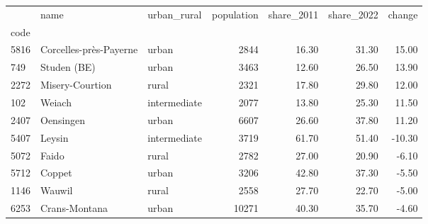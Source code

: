\begin{tabular}{lllrrrr}
\toprule
 & name & urban\_rural & population & share\_2011 & share\_2022 & change \\
code &  &  &  &  &  &  \\
\midrule
5816 & Corcelles-près-Payerne & urban & 2844 & 16.30 & 31.30 & 15.00 \\
749 & Studen (BE) & urban & 3463 & 12.60 & 26.50 & 13.90 \\
2272 & Misery-Courtion & rural & 2321 & 17.80 & 29.80 & 12.00 \\
102 & Weiach & intermediate & 2077 & 13.80 & 25.30 & 11.50 \\
2407 & Oensingen & urban & 6607 & 26.60 & 37.80 & 11.20 \\
5407 & Leysin & intermediate & 3719 & 61.70 & 51.40 & -10.30 \\
5072 & Faido & rural & 2782 & 27.00 & 20.90 & -6.10 \\
5712 & Coppet & urban & 3206 & 42.80 & 37.30 & -5.50 \\
1146 & Wauwil & rural & 2558 & 27.70 & 22.70 & -5.00 \\
6253 & Crans-Montana & urban & 10271 & 40.30 & 35.70 & -4.60 \\
\bottomrule
\end{tabular}
